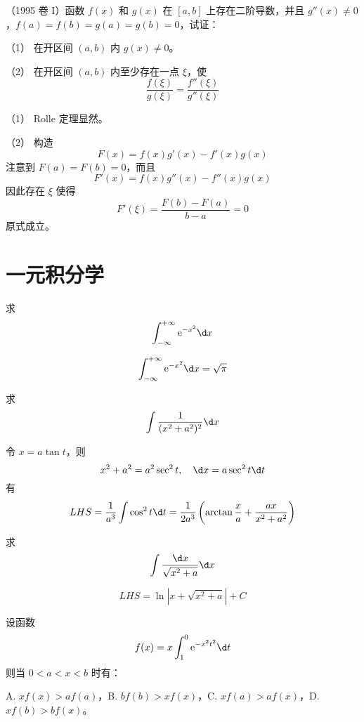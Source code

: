 \begin{problem}[000064]
（1995 卷 I）函数 $f(x)$ 和 $g(x)$ 在 $[a,b]$ 上存在二阶导数，并且 $g''(x) \neq 0$，$f(a) = f(b) = g(a) = g(b) = 0$，试证：

（1） 在开区间 $(a, b)$ 内 $g(x) \neq 0$。

（2） 在开区间 $(a, b)$ 内至少存在一点 $\xi$，使
\[ \frac{f(\xi)}{g(\xi)} = \frac{f''(\xi)}{g''(\xi)} \]
\end{problem}

\begin{solution}
	（1） Rolle 定理显然。

	（2） 构造
	\[ F(x) = f(x) g'(x) - f'(x) g(x) \]
	注意到 $F(a) = F(b) = 0$，而且
	\[ F'(x) = f(x) g''(x) - f''(x) g(x) \]
	因此存在 $\xi$ 使得
	\[ F'(\xi) = \frac{F(b) - F(a)}{b - a} = 0 \]
	原式成立。
\end{solution}

\section{一元积分学}

\begin{problem}[000008]
求
\[ \int_{-\infty}^{+\infty} \ee^{-x^2}\d x \]
\end{problem}
\begin{solution}
	\[ \int_{-\infty}^{+\infty} \ee^{-x^2}\d x = \sqrt{\pi} \]
\end{solution}

\begin{problem}[000014]
求
\[ \int \frac{1}{(x^2+a^2)^2} \d x \]
\end{problem}
\begin{solution}
	令 $x = a \tan t$，则
	\[ x^2 + a^2 = a^2 \sec^2 t, \quad \d x = a \sec^2 t \d t \]
	有
	\[ LHS =  \frac{1}{a^3}\int \cos^2 t \d t = \frac{1}{2a^3} \left( \arctan \frac{x}{a} + \frac{ax}{x^2+a^2} \right) \]
\end{solution}


\begin{problem}[000015]
求
\[ \int \frac{\d x}{\sqrt{x^2 + a}} \d x \]
\end{problem}
\begin{solution}
	\[ LHS =  \ln |x + \sqrt{x^2+a}| + C \]
\end{solution}


\begin{problem}[000022]
设函数
\[ f(x) = x \int_{1}^{0} \ee^{-x^2t^2} \d t \]
则当 $0<a<x<b$ 时有：

A. $xf(x) > af(a)$，B. $bf(b) > x f(x)$，C. $xf(a) > af(x)$，D. $xf(b) > bf(x)$。
\end{problem}

